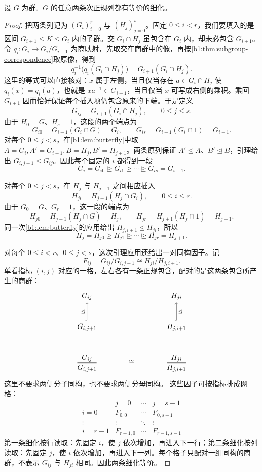 \begin{theorem}[Schreier]\label{b1:thm:schreier-refinement}
	设 \(G\) 为群。\(G\) 的任意两条次正规列都有等价的细化。
\end{theorem}
\begin{proof}
	把两条列记为 \((G_i)_{i=0}^r\) 与 \((H_j)_{j=0}^s\)。固定 \(0\le i<r\)，我们要填入的是区间 \(G_{i+1}\leq K\leq G_i\) 内的子群。交 \(G_i\cap H_j\) 虽包含在 \(G_i\) 内，却未必包含 \(G_{i+1}\)。令 \(q_i:G_i\to G_i/G_{i+1}\) 为商映射，先取交在商群中的像，再按\cref{b1:thm:subgroup-correspondence}取原像，得到
	\[
		q_i^{-1}\!\bigl(q_i(G_i\cap H_j)\bigr) =G_{i+1}(G_i\cap H_j).
	\]
	这里的等式可以直接核对：\(x\) 属于左侧，当且仅当存在 \(a\in G_i\cap H_j\) 使 \(q_i(x)=q_i(a)\)，也就是 \(xa^{-1}\in G_{i+1}\)，当且仅当 \(x\) 可写成右侧的乘积。乘回 \(G_{i+1}\) 因而恰好保证每个插入项仍包含原来的下端。于是定义
	\[
		G_{ij}=G_{i+1}(G_i\cap H_j),\qquad 0\le j\le s.
	\]
	由于 \(H_0=G\)、\(H_s=1\)，这段的两个端点为
	\[
		G_{i0}=G_{i+1}(G_i\cap G)=G_i, \qquad G_{is}=G_{i+1}(G_i\cap1)=G_{i+1}.
	\]
	对每个 \(0\le j<s\)，在\cref{b1:lem:butterfly}中取 \(A=G_i,A'=G_{i+1},B=H_j,B'=H_{j+1}\)。两条原列保证 \(A'\trianglelefteq A\)、\(B'\trianglelefteq B\)，引理给出 \(G_{i,j+1}\trianglelefteq G_{ij}\)。因此每个固定的 \(i\) 都得到一段
	\[
		G_i=G_{i0}\trianglerighteq G_{i1}\trianglerighteq\cdots \trianglerighteq G_{is}=G_{i+1}.
	\]

	对每个 \(0\le j<s\)，在 \(H_j\) 与 \(H_{j+1}\) 之间相应插入
	\[
		H_{ji}=H_{j+1}(H_j\cap G_i),\qquad 0\le i\le r.
	\]
	由于 \(G_0=G\)、\(G_r=1\)，这一段的端点为
	\[
		H_{j0}=H_{j+1}(H_j\cap G)=H_j, \qquad H_{jr}=H_{j+1}(H_j\cap1)=H_{j+1}.
	\]
	同一次\cref{b1:lem:butterfly}的应用给出 \(H_{j,i+1}\trianglelefteq H_{ji}\)，所以
	\[
		H_j=H_{j0}\trianglerighteq H_{j1}\trianglerighteq\cdots \trianglerighteq H_{jr}=H_{j+1}.
	\]

	对每个 \(0\le i<r\)、\(0\le j<s\)，这次引理应用还给出一对同构因子。记
	\[
		F_{ij}=G_{ij}/G_{i,j+1}\cong H_{ji}/H_{j,i+1}.
	\]
	单看指标 \((i,j)\) 对应的一格，左右各有一条正规包含，配对的是这两条包含所产生的商群：
	\[
		\begin{tikzcd}[row sep=large, column sep=large]
			G_{ij} && H_{ji} \\
			G_{i,j+1} \arrow[u,hook,"\trianglelefteq"] && H_{j,i+1} \arrow[u,hook,"\trianglelefteq"'] \\
			\dfrac{G_{ij}}{G_{i,j+1}} & \cong & \dfrac{H_{ji}}{H_{j,i+1}}
		\end{tikzcd}
	\]
	这里不要求两侧分子同构，也不要求两侧分母同构。 这些因子可按指标排成网格：
	\[
		\begin{array}{c|ccc}
			& j=0 & \cdots & j=s-1\\ \hline i=0 & F_{0,0} & \cdots & F_{0,s-1}\\
			\vdots & \vdots & \ddots & \vdots\\
			i=r-1 & F_{r-1,0} & \cdots & F_{r-1,s-1}
		\end{array}
	\]
	第一条细化按行读取：先固定 \(i\)，使 \(j\) 依次增加，再进入下一行；第二条细化按列读取：先固定 \(j\)，使 \(i\) 依次增加，再进入下一列。每个格子只配对一组同构的商群，不表示 \(G_{ij}\) 与 \(H_{ji}\) 相同。因此两条细化等价。


\end{proof}
